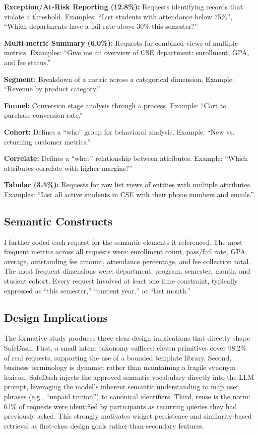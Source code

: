 \documentclass[11pt]{article}
\begin{document}
\noindent\textbf{Exception/At‑Risk Reporting (12.8\%):} Requests identifying records that violate a threshold. Examples: ``List students with attendance below 75\%'', ``Which departments have a fail rate above 30\% this semester?''

\noindent\textbf{Multi‑metric Summary (6.0\%):} Requests for combined views of multiple metrics. Examples: ``Give me an overview of CSE department: enrollment, GPA, and fee status.''

\noindent\textbf{Segment:} Breakdown of a metric across a categorical dimension. Example: ``Revenue by product category.''

\noindent\textbf{Funnel:} Conversion stage analysis through a process. Example: ``Cart to purchase conversion rate.''

\noindent\textbf{Cohort:} Defines a ``who'' group for behavioral analysis. Example: ``New vs. returning customer metrics.''

\noindent\textbf{Correlate:} Defines a ``what'' relationship between attributes. Example: ``Which attributes correlate with higher margins?''

\noindent\textbf{Tabular (3.5\%):} Requests for raw list views of entities with multiple attributes. Examples: ``List all active students in CSE with their phone numbers and emails.''

\subsection{Semantic Constructs}
I further coded each request for the semantic elements it referenced. The most frequent metrics across all requests were: enrollment count, pass/fail rate, GPA average, outstanding fee amount, attendance percentage, and fee collection total. The most frequent dimensions were: department, program, semester, month, and student cohort. Every request involved at least one time constraint, typically expressed as ``this semester,'' ``current year,'' or ``last month.''

\subsection{Design Implications}
The formative study produces three clear design implications that directly shape SafeDash. First, a small intent taxonomy suffices: eleven primitives cover 98.2\% of real requests, supporting the use of a bounded template library. Second, business terminology is dynamic: rather than maintaining a fragile synonym lexicon, SafeDash injects the approved semantic vocabulary directly into the LLM prompt, leveraging the model's inherent semantic understanding to map user phrases (e.g., ``unpaid tuition'') to canonical identifiers. Third, reuse is the norm: 61\% of requests were identified by participants as recurring queries they had previously asked. This strongly motivates widget persistence and similarity‑based retrieval as first‑class design goals rather than secondary features.
\end{document}
